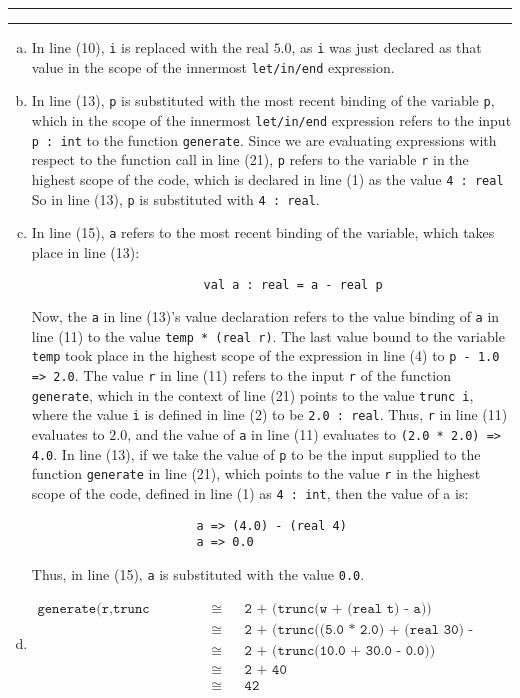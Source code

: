\documentclass[11pt]{article}
\newcounter{questionCounter}
\newcounter{partCounter}[questionCounter]
\newenvironment{question}[2][\arabic{questionCounter}]{%
    \setcounter{partCounter}{0}%
    \vspace{.25in} \hrule \vspace{0.5em}%
        \noindent{\bf #2}%
    \vspace{0.8em} \hrule \vspace{.10in}%
    \addtocounter{questionCounter}{1}%
}{}
\begin{document}
\begin{question}{Task 2.2}
\begin{enumerate}[(a)]
    \item In line (10), \verb!i! is replaced with the real $5.0$, as \verb!i! was just declared as that value in the scope of the innermost \verb!let/in/end! expression.
    \item In line (13), \verb!p! is substituted with the most recent binding of the variable \verb!p!, which in the scope of the innermost \verb!let/in/end! expression refers to the input \verb!p : int! to the function \verb!generate!. Since we are evaluating expressions with respect to the function call in line (21), \verb!p! refers to the variable \verb!r! in the highest scope of the code, which is declared in line (1) as the value \verb!4 : real! So in line (13), \verb!p! is substituted with \verb!4 : real!.
    \item In line (15), \verb!a! refers to the most recent binding of the variable, which takes place in line (13):
    \begin{verbatim}
                        val a : real = a - real p
    \end{verbatim}  
    Now, the \verb!a! in line (13)'s value declaration refers to the value binding of \verb!a! in line (11) to the value \verb!temp * (real r)!. The last value bound to the variable \verb!temp! took place in the highest scope of the expression in line (4) to \verb!p - 1.0 => 2.0!. The value \verb!r! in line (11) refers to the input \verb!r! of the function \verb!generate!, which in the context of line (21) points to the value \verb!trunc i!, where the value \verb!i! is defined in line (2) to be \verb!2.0 : real!. Thus, \verb!r! in line (11) evaluates to $2.0$, and the value of \verb!a! in line (11) evaluates to \verb!(2.0 * 2.0) => 4.0!.
    In line (13), if we take the value of \verb!p! to be the input supplied to the function \verb!generate! in line (21), which points to the value \verb!r! in the highest scope of the code, defined in line (1) as \verb!4 : int!, then the value of a is:
    \begin{verbatim}
                       a => (4.0) - (real 4)
                       a => 0.0
    \end{verbatim}
    Thus, in line (15), \verb!a! is substituted with the value \verb!0.0!.

\newpage
    
    \item \begin{align*}
    \texttt{generate(r,trunc i,temp)} & \cong && \texttt{2 + (trunc(w + (real t) - a))} \\
    & \cong  && \texttt{2 + (trunc((5.0 * 2.0) + (real 30) - 0.0))} \\
    & \cong  && \texttt{2 + (trunc(10.0 + 30.0 - 0.0))} \\
    & \cong  && \texttt{2 + 40} \\
    & \cong  && \texttt{42}
    \end{align*}
\end{enumerate}
\end{question}
\end{document}
